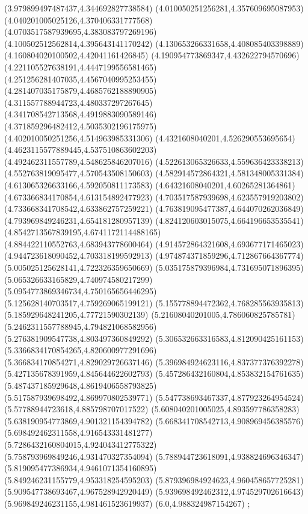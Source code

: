 {(3.979899497487437,4.344692827738584)
(4.010050251256281,4.357609695087953)
(4.040201005025126,4.370406331777568)
(4.0703517587939695,4.383083797269196)
(4.100502512562814,4.395643141170242)
(4.130653266331658,4.408085403398889)
(4.160804020100502,4.42041161426845)
(4.190954773869347,4.432622794570696)
(4.221105527638191,4.4447199556581465)
(4.251256281407035,4.4567040995253455)
(4.281407035175879,4.4685762188890905)
(4.311557788944723,4.480337297267645)
(4.341708542713568,4.4919883090589146)
(4.371859296482412,4.5035302196175975)
(4.402010050251256,4.514963985331306)
(4.4321608040201,4.526290553695654)
(4.4623115577889445,4.537510863602203)
(4.492462311557789,4.548625846207016)
(4.522613065326633,4.559636423338213)
(4.552763819095477,4.570543508150603)
(4.582914572864321,4.581348005331384)
(4.613065326633166,4.592050811173583)
(4.64321608040201,4.60265281364861)
(4.673366834170854,4.613154892477923)
(4.703517587939698,4.623557919203802)
(4.733668341708542,4.633862757259221)
(4.763819095477387,4.644070262036849)
(4.793969849246231,4.654181280957139)
(4.824120603015075,4.664196653535541)
(4.8542713567839195,4.6741172114488165)
(4.884422110552763,4.683943778600464)
(4.914572864321608,4.693677171465023)
(4.944723618090452,4.703318199592913)
(4.974874371859296,4.712867664367774)
(5.005025125628141,4.722326359650669)
(5.035175879396984,4.731695071896395)
(5.065326633165829,4.740974580217299)
(5.0954773869346734,4.750165656446295)
(5.125628140703517,4.759269065199121)
(5.155778894472362,4.768285563935813)
(5.185929648241205,4.77721590302139)
(5.21608040201005,4.786060825785781)
(5.2462311557788945,4.794821068582956)
(5.276381909547738,4.803497360849292)
(5.306532663316583,4.812090425161153)
(5.3366834170854265,4.820600977291696)
(5.366834170854271,4.829029726637146)
(5.396984924623116,4.837377376392278)
(5.427135678391959,4.845644622602793)
(5.457286432160804,4.853832154761635)
(5.487437185929648,4.8619406558793825)
(5.517587939698492,4.869970802539771)
(5.547738693467337,4.877923264954524)
(5.57788944723618,4.885798707017522)
(5.608040201005025,4.893597786358283)
(5.638190954773869,4.901321154394782)
(5.668341708542713,4.908969456385576)
(5.698492462311558,4.916543331481277)
(5.7286432160804015,4.924043412775322)
(5.758793969849246,4.931470327354094)
(5.788944723618091,4.938824696346347)
(5.819095477386934,4.9461071354160895)
(5.849246231155779,4.953318254595203)
(5.879396984924623,4.960458657725281)
(5.909547738693467,4.967528942920449)
(5.939698492462312,4.974529702616643)
(5.969849246231155,4.981461523619937)
(6.0,4.988324987154267)
};
